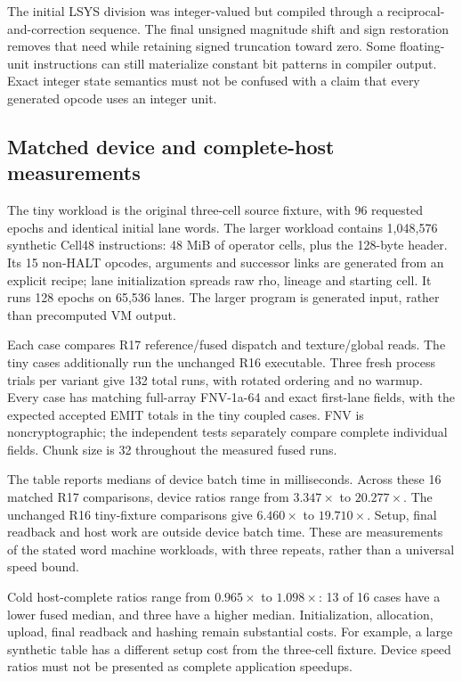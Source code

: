 The initial LSYS division was integer-valued but compiled through a
reciprocal-and-correction sequence. The final unsigned magnitude shift
and sign restoration removes that need while retaining signed truncation
toward zero. Some floating-unit instructions can still materialize constant
bit patterns in compiler output. Exact integer state semantics must not be
confused with a claim that every generated opcode uses an integer unit.

\subsection{Matched device and complete-host measurements}

The tiny workload is the original three-cell source fixture, with 96
requested epochs and identical initial lane words. The larger workload
contains 1,048,576 synthetic Cell48 instructions: 48 MiB of operator cells,
plus the 128-byte header. Its 15 non-HALT opcodes, arguments and successor
links are generated from an explicit recipe; lane initialization spreads
raw rho, lineage and starting cell. It runs 128 epochs on 65,536 lanes.
The larger program is generated input, rather than precomputed VM output.

Each case compares R17 reference/fused dispatch and texture/global reads.
The tiny cases additionally run the unchanged R16 executable. Three fresh
process trials per variant give 132 total runs, with rotated ordering and
no warmup. Every case has matching full-array FNV-1a-64 and exact first-lane
fields, with the expected accepted EMIT totals in the tiny coupled cases.
FNV is noncryptographic; the independent tests separately compare complete
individual fields. Chunk size is 32 throughout the measured fused runs.



The table reports medians of device batch time in milliseconds. Across
these 16 matched R17 comparisons, device ratios range from
$3.347\times$ to $20.277\times$. The unchanged R16 tiny-fixture comparisons
give $6.460\times$ to $19.710\times$. Setup, final readback and host work
are outside device batch time. These are measurements of the stated word
machine workloads, with three repeats, rather than a universal speed bound.

Cold host-complete ratios range from $0.965\times$ to $1.098\times$:
13 of 16 cases have a lower fused median, and three have a higher median.
Initialization, allocation, upload, final readback and hashing remain
substantial costs. For example, a large synthetic table has a different
setup cost from the three-cell fixture. Device speed ratios must not be
presented as complete application speedups.

